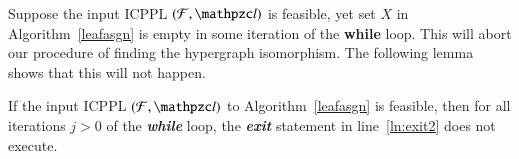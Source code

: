 \documentclass[MS,synopsis]{iitmdiss}
\begin{document}

Suppose the input ICPPL $(\cF, \cl)$ is feasible, yet set $X$ in
Algorithm~\ref{leafasgn} is empty in some iteration of the {\bf while}
loop. This will abort our procedure of finding the hypergraph
isomorphism. The following lemma shows that this will not happen.

\begin{lemma}
  \label{lem:xnotempty}
  If the input ICPPL $(\cF, \cl)$ to Algorithm~\ref{leafasgn} is
  feasible, then for all iterations $j > 0$ of the {\em \bf while}
  loop, the {\em \bf exit} statement in line~\ref{ln:exit2} does not
  execute.
\end{lemma}
\end{document}
